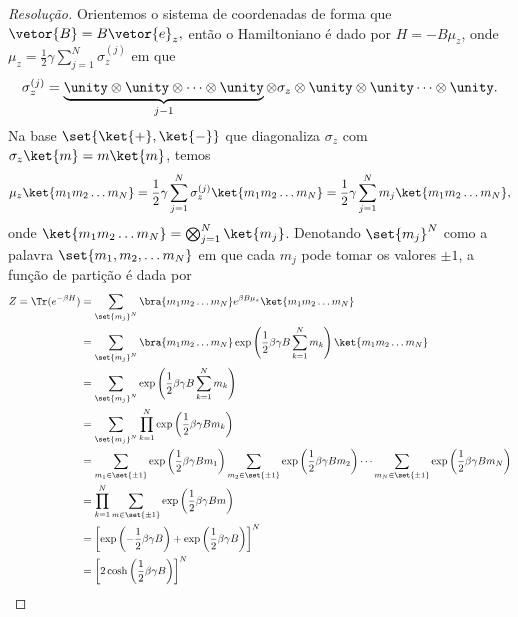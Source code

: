 \begin{proof}[Resolução]
   Orientemos o sistema de coordenadas de forma que \(\vetor{B} = B \vetor{e}_z,\) então o Hamiltoniano é dado por \(H = - B \mu_z\), onde \(\mu_z = \frac12 \gamma \sum_{j = 1}^N \sigma_z^{(j)}\) em que 
   \begin{equation*}
      \sigma_z^{(j)} = \underbrace{\unity \otimes \unity \otimes \dots \otimes \unity}_{j-1} \otimes \sigma_z \otimes \unity \otimes \unity \dots \otimes \unity.
   \end{equation*}
   Na base \(\set{\ket{+}, \ket{-}}\) que diagonaliza \(\sigma_z\) com \(\sigma_z\ket{m} = m \ket{m}\), temos
   \begin{equation*}
      \mu_z \ket{m_1 m_2 \dots m_N} = \frac12 \gamma \sum_{j = 1}^N \sigma_z^{(j)} \ket{m_1 m_2 \dots m_N} = \frac12 \gamma \sum_{j = 1}^N m_j \ket{m_1 m_2 \dots m_N},
   \end{equation*}
   onde \(\ket{m_1 m_2 \dots m_N} = \bigotimes_{j = 1}^N \ket{m_j}\). Denotando \(\set{m_j}^N\) como a palavra \(\set{m_1, m_2, \dots m_N}\) em que cada \(m_j\) pode tomar os valores \(\pm 1\), a função de partição é dada por
   \begin{align*}
      Z = \Tr(e^{- \beta H}) &= \sum_{\set{m_j}^N} \bra{m_1m_2 \dots m_N} e^{\beta B \mu_z} \ket{m_1 m_2 \dots m_N}\\
                             &= \sum_{\set{m_j}^N} \bra{m_1 m_2 \dots m_N} \exp\left(\frac12 \beta \gamma B \sum_{k = 1}^{N}{m_k}\right)\ket{m_1 m_2 \dots m_N}\\
                             &= \sum_{\set{m_j}^N} \exp\left(\frac12 \beta \gamma B \sum_{k = 1}^N m_k\right)\\
                             &= \sum_{\set{m_j}^N} \prod_{k = 1}^N \exp\left(\frac12 \beta \gamma B m_k\right)\\
                             &= \sum_{m_1 \in \set{\pm1}}{\exp\left(\frac12 \beta \gamma B m_1\right)}\sum_{m_2 \in \set{\pm1}}{\exp\left(\frac12 \beta \gamma B m_2\right)}\dots \sum_{m_N \in \set{\pm1}}{\exp\left(\frac12 \beta \gamma B m_N\right)}\\
                             &= \prod_{k = 1}^N \sum_{m \in \set{\pm1}} \exp\left(\frac12 \beta \gamma B m\right)\\
                             &= \left[\exp\left(-\frac12 \beta \gamma B\right) + \exp\left(\frac12 \beta \gamma B\right)\right]^N\\
                             &= \left[2 \cosh\left(\frac12 \beta \gamma B\right)\right]^N

\end{align*}
\end{proof}
